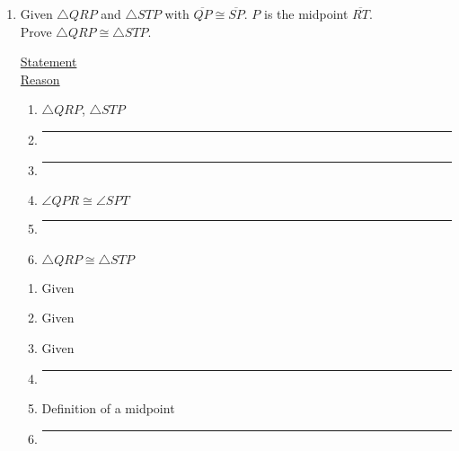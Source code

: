 \begin{enumerate}
\newpage
\item Given $\triangle QRP$ and $\triangle STP$ with $\overline{QP} \cong \overline{SP}$. $P$ is the midpoint $\overline{RT}$.\\ Prove $\triangle QRP \cong \triangle STP$.\\[0.5cm]
  \begin{multicols}{2}
    \underline{Statement} \\
    \underline{Reason}
  \end{multicols}
  \begin{multicols}{2}
   \raggedcolumns
   \begin{enumerate}[label={\arabic*)}]
     \item $\triangle QRP$, $\triangle STP$ \vspace{0.3cm}
     \item \rule{4cm}{0.15mm} \vspace{0.3cm}
     \item \rule{4cm}{0.15mm} \vspace{0.3cm}
     \item $\angle QPR \cong \angle SPT$  \vspace{0.3cm}
     \item \rule{4cm}{0.15mm} \vspace{0.3cm}
     \item $\triangle QRP \cong \triangle STP$ \vspace{0.3cm}
   \end{enumerate}
   \begin{enumerate}[label={\arabic*)}]
     \item Given \vspace{0.3cm}
     \item Given \vspace{0.3cm}
     \item Given \vspace{0.3cm}
     \item \rule{4cm}{0.15mm} \vspace{0.3cm}
     \item Definition of a midpoint \vspace{0.3cm}
     \item \rule{4cm}{0.15mm} \vspace{0.3cm}
   \end{enumerate}
 \end{multicols} \vspace{0.5cm}


\end{enumerate}
